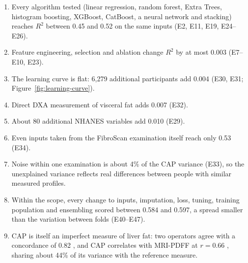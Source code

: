 \begin{enumerate}
  \item Every algorithm tested (linear regression, random forest, Extra Trees, histogram boosting, XGBoost, CatBoost, a neural network and stacking) reaches $R^2$ between 0.45 and 0.52 on the same inputs (E2, E11, E19, E24--E26).
  \item Feature engineering, selection and ablation change $R^2$ by at most 0.003 (E7--E10, E23).
  \item The learning curve is flat: 6,279 additional participants add 0.004 (E30, E31; Figure~\ref{fig:learning-curve}).
  \item Direct DXA measurement of visceral fat adds 0.007 (E32).
  \item About 80 additional NHANES variables add 0.010 (E29).
  \item Even inputs taken from the FibroScan examination itself reach only 0.53 (E34).
  \item Noise within one examination is about 4\% of the CAP variance (E33), so the unexplained variance reflects real differences between people with similar measured profiles.
  \item Within the scope, every change to inputs, imputation, loss, tuning, training population and ensembling scored between 0.584 and 0.597, a spread smaller than the variation between folds (E40--E47).
  \item CAP is itself an imperfect measure of liver fat: two operators agree with a concordance of 0.82 \cite{ferraioli2021cap}, and CAP correlates with MRI-PDFF at $r = 0.66$ \cite{ahn2018cap}, sharing about 44\% of its variance with the reference measure.
\end{enumerate}

